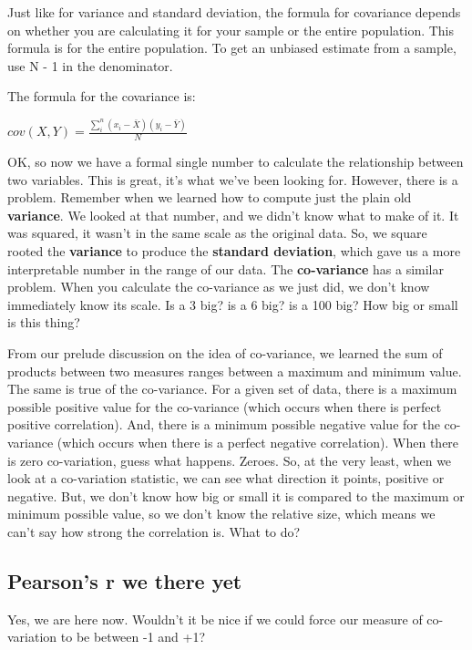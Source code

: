 \documentclass[
]{book}
\begin{document}
Just like for variance and standard deviation, the formula for covariance depends on whether you are calculating it for your sample or the entire population. This formula is for the entire population. To get an unbiased estimate from a sample, use N - 1 in the denominator.

The formula for the covariance is:

\(cov(X,Y) = \frac{\sum_{i}^{n}(x_{i}-\bar{X})(y_{i}-\bar{Y})}{N}\)

OK, so now we have a formal single number to calculate the relationship between two variables. This is great, it's what we've been looking for. However, there is a problem. Remember when we learned how to compute just the plain old \textbf{variance}. We looked at that number, and we didn't know what to make of it. It was squared, it wasn't in the same scale as the original data. So, we square rooted the \textbf{variance} to produce the \textbf{standard deviation}, which gave us a more interpretable number in the range of our data. The \textbf{co-variance} has a similar problem. When you calculate the co-variance as we just did, we don't know immediately know its scale. Is a 3 big? is a 6 big? is a 100 big? How big or small is this thing?

From our prelude discussion on the idea of co-variance, we learned the sum of products between two measures ranges between a maximum and minimum value. The same is true of the co-variance. For a given set of data, there is a maximum possible positive value for the co-variance (which occurs when there is perfect positive correlation). And, there is a minimum possible negative value for the co-variance (which occurs when there is a perfect negative correlation). When there is zero co-variation, guess what happens. Zeroes. So, at the very least, when we look at a co-variation statistic, we can see what direction it points, positive or negative. But, we don't know how big or small it is compared to the maximum or minimum possible value, so we don't know the relative size, which means we can't say how strong the correlation is. What to do?

\subsection{Pearson's r we there yet}\label{pearsons-r-we-there-yet}

Yes, we are here now. Wouldn't it be nice if we could force our measure of co-variation to be between -1 and +1?
\end{document}
